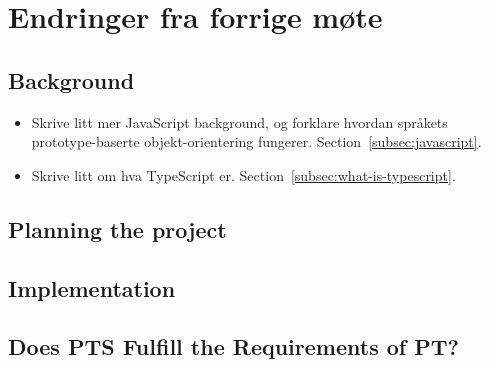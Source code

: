 
\chapter*{Endringer fra forrige møte}

\section*{Background}

\begin{itemize}
    \item Skrive litt mer JavaScript background, og forklare hvordan språkets prototype-baserte objekt-orientering fungerer.
    Section~\vref{subsec:javascript}.
    \item Skrive litt om hva TypeScript er.
    Section~\vref{subsec:what-is-typescript}.
\end{itemize}

\section*{Planning the project}

\begin{itemize}
\end{itemize}

\section*{Implementation}

\begin{itemize}
\end{itemize}

\section*{Does PTS Fulfill the Requirements of PT?}

\begin{itemize}
\end{itemize}
